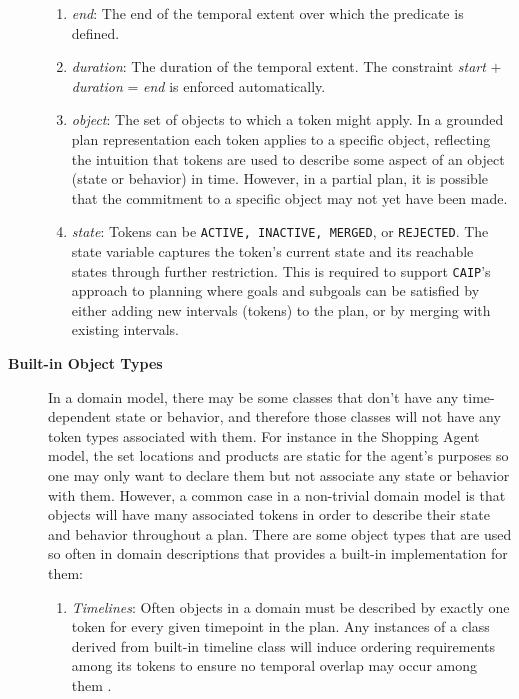 \begin{description}
\begin{enumerate}
  \item \textit {end}: The end of the temporal extent over which the
    predicate is defined.

  \item \textit {duration}: The duration of the temporal extent. The
    constraint \textit{start} $+$ \textit{duration} = \textit{end} is
    enforced automatically.

  \item \textit{object}: The set of objects to which a token might
    apply. In a grounded plan representation each token applies to a
    specific object, reflecting the intuition that tokens are used to
    describe some aspect of an object (\ie state or behavior) in
    time. However, in a partial plan, it is possible that the
    commitment to a specific object may not yet have been made.

  \item \textit{state}: Tokens can be \texttt{ACTIVE, INACTIVE,
      MERGED}, or \texttt{REJECTED}. The state variable captures the
    token's current state and its reachable states through further
    restriction.  This is required to support \texttt{CAIP}'s approach
    to planning where goals and subgoals can be satisfied by either
    adding new intervals (tokens) to the plan, or by merging with
    existing intervals. 
    
  \end{enumerate}

\item[\textbf{Built-in Object Types}] In a domain model, there may be
  some classes that don't have any time-dependent state or behavior,
  and therefore those classes will not have any token types associated
  with them. For instance in the Shopping Agent model, the set
  locations and products are static for the agent's purposes so one
  may only want to declare them but not associate any state or
  behavior with them.  However, a common case in a non-trivial domain
  model is that objects will have many associated tokens in order to
  describe their state and behavior throughout a plan. There are some
  object types that are used so often in domain descriptions that \eu
  provides a built-in implementation for them:

\begin{enumerate}

\item \textit{Timelines}: Often objects in a domain must be described
  by exactly one token for every given timepoint in the plan. Any
  instances of a class derived from \eus built-in timeline class will
  induce ordering requirements among its tokens to ensure no temporal
  overlap may occur among them \cite{mus94}.  


\end{enumerate}
\end{description}
